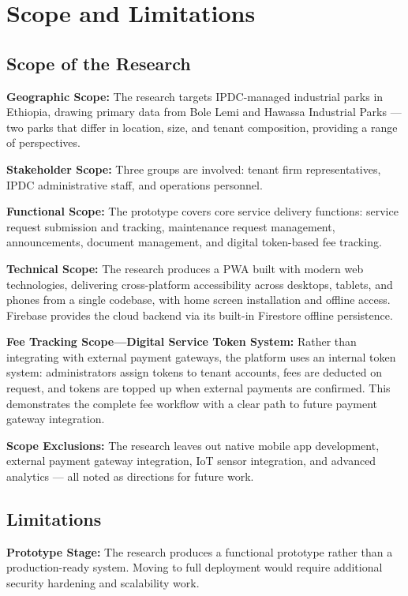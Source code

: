\section{Scope and Limitations}

\subsection{Scope of the Research}

\textbf{Geographic Scope:} The research targets IPDC-managed industrial parks in Ethiopia, drawing primary data from Bole Lemi and Hawassa Industrial Parks — two parks that differ in location, size, and tenant composition, providing a range of perspectives.

\textbf{Stakeholder Scope:} Three groups are involved: tenant firm representatives, IPDC administrative staff, and operations personnel.

\textbf{Functional Scope:} The prototype covers core service delivery functions: service request submission and tracking, maintenance request management, announcements, document management, and digital token-based fee tracking.

\textbf{Technical Scope:} The research produces a PWA built with modern web technologies, delivering cross-platform accessibility across desktops, tablets, and phones from a single codebase, with home screen installation and offline access. Firebase provides the cloud backend via its built-in Firestore offline persistence.

\textbf{Fee Tracking Scope---Digital Service Token System:} Rather than integrating with external payment gateways, the platform uses an internal token system: administrators assign tokens to tenant accounts, fees are deducted on request, and tokens are topped up when external payments are confirmed. This demonstrates the complete fee workflow with a clear path to future payment gateway integration.

\textbf{Scope Exclusions:} The research leaves out native mobile app development, external payment gateway integration, IoT sensor integration, and advanced analytics — all noted as directions for future work.

\subsection{Limitations}

\textbf{Prototype Stage:} The research produces a functional prototype rather than a production-ready system. Moving to full deployment would require additional security hardening and scalability work.

